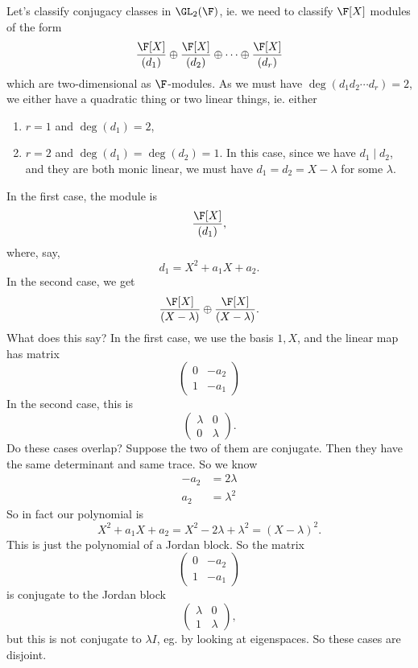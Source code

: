 \documentclass[a4paper]{article}
\begin{document}
\begin{eg}
  Let's classify conjugacy classes in $\GL_2(\F)$, ie. we need to classify $\F[X]$ modules of the form
  \[
    \frac{\F[X]}{(d_1)} \oplus \frac{\F[X]}{(d_2)} \oplus \cdots \oplus \frac{\F[X]}{(d_r)}
  \]
  which are two-dimensional as $\F$-modules. As we must have $\deg(d_1d_2 \cdots d_r) = 2$, we either have a quadratic thing or two linear things, ie. either
  \begin{enumerate}
    \item $r = 1$ and $\deg (d_1) = 2$,
    \item $r = 2$ and $\deg (d_1) = \deg(d_2) = 1$. In this case, since we have $d_1 \mid d_2$, and they are both monic linear, we must have $d_1 = d_2 = X - \lambda$ for some $\lambda$.
  \end{enumerate}
  In the first case, the module is
  \[
    \frac{\F[X]}{(d_1)},
  \]
  where, say,
  \[
    d_1 = X^2 + a_1 X + a_2.
  \]
  In the second case, we get
  \[
    \frac{\F[X]}{(X - \lambda)} \oplus \frac{\F[X]}{(X - \lambda)}.
  \]
  What does this say? In the first case, we use the basis $1, X$, and the linear map has matrix
  \[
    \begin{pmatrix}
      0 & -a_2\\
      1 & -a_1
    \end{pmatrix}
  \]
  In the second case, this is
  \[
    \begin{pmatrix}
      \lambda & 0\\
      0 & \lambda
    \end{pmatrix}.
  \]
  Do these cases overlap? Suppose the two of them are conjugate. Then they have the same determinant and same trace. So we know
  \begin{align*}
    -a_2 &= 2\lambda\\
    a_2 &= \lambda^2
  \end{align*}
  So in fact our polynomial is
  \[
    X^2 + a_1 X + a_2 = X^2 - 2\lambda + \lambda^2 = (X - \lambda)^2.
  \]
  This is just the polynomial of a Jordan block. So the matrix
  \[
    \begin{pmatrix}
      0 & -a_2\\
      1 & -a_1
    \end{pmatrix}
  \]
  is conjugate to the Jordan block
  \[
    \begin{pmatrix}
      \lambda & 0\\
      1 & \lambda
    \end{pmatrix},
  \]
  but this is not conjugate to $\lambda I$, eg. by looking at eigenspaces. So these cases are disjoint.


\end{eg}
\end{document}
